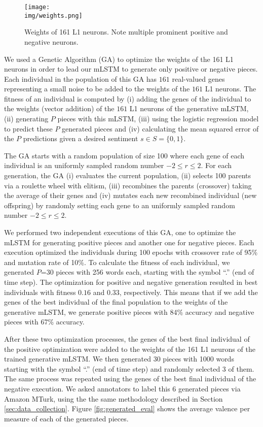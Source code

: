 \begin{figure}[!h]
 \centering
 \texttt{[image: \\img/weights.png]}
 \caption{Weights of 161 L1 neurons. Note multiple prominent positive and negative neurons.}
 \label{fig:final_weights}
\end{figure}

We used a Genetic Algorithm (GA) to optimize the weights of the
161 L1 neurons in order to lead our mLSTM to generate only positive
or negative pieces. Each individual in the population of this GA has $161$
real-valued genes representing a small noise to be added to the weights of the $161$ L1 neurons. The fitness of an individual is computed by (i) adding the genes of the individual to the weights (vector addition) of the $161$ L1 neurons of the generative mLSTM, (ii)
generating $P$ pieces with this mLSTM, (iii) using the logistic regression model to predict
these $P$ generated pieces and (iv) calculating the mean squared error of the $P$
predictions given a desired sentiment $s \in S = \{0, 1\}$.

The GA starts with a random population of size 100 where each gene of
each individual is an uniformly sampled random number $-2 \leq r \leq 2$.
For each generation, the GA (i) evaluates the current population,
(ii) selects 100 parents via a roulette wheel with elitism, (iii) recombines the
parents (crossover) taking the average of their genes and (iv) mutates each
new recombined individual (new offspring) by randomly setting each gene to
an uniformly sampled random number $-2 \leq r \leq 2$.

We performed two independent executions of this GA,
one to optimize the mLSTM for generating positive pieces
and another one for negative pieces. Each execution optimized the
individuals during 100 epochs with crossover rate of 95\% and
mutation rate of 10\%. To calculate the fitness of each individual, we generated $P$=30 pieces with 256 words each, starting with the symbol ``.'' (end of time step).
The optimization for positive and negative generation resulted in best individuals with
fitness $0.16$ and $0.33$, respectively. This means that if we
add the genes of the best individual of the final population to the weights of the generative mLSTM, we generate positive pieces
with 84\% accuracy and negative pieces with 67\% accuracy.

After these two optimization processes, the genes of the
best final individual of the positive optimization were
added to the  weights of the 161 L1 neurons of the trained
generative mLSTM. We then generated 30 pieces with 1000
words starting with the symbol ``.'' (end of time step) and
randomly selected 3 of them. The same process was repeated
using the genes of the best final individual of the
negative execution. We asked annotators to label this 6
generated pieces via Amazon MTurk, using the the same
methodology described in Section \ref{sec:data_collection}.
Figure \ref{fig:generated_eval} shows the average valence per measure of each of the generated pieces.

